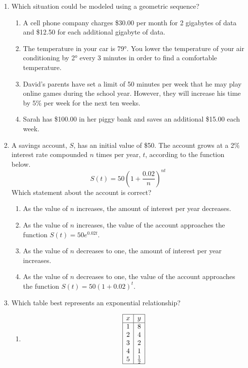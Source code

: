 \documentclass[12pt, twoside]{article}
\begin{document}
\begin{enumerate}[itemsep=0.5cm]
\item Which situation could be modeled using a geometric sequence?
\begin{enumerate}
    \item A cell phone company charges \$30.00 per month for 2 gigabytes of data and \$12.50 for each additional gigabyte of data.
    \item The temperature in your car is 79°. You lower the temperature of your air conditioning by 2° every 3 minutes in order to find a comfortable temperature.
    \item David’s parents have set a limit of 50 minutes per week that he may play online games during the school year. However, they will increase his time by 5\% per week for the next ten weeks.
    \item Sarah has \$100.00 in her piggy bank and saves an additional \$15.00 each week.
\end{enumerate}

\item A savings account, \( S \), has an initial value of \$50. The account grows at a 2\% interest rate compounded \( n \) times per year, \( t \), according to the function below.
\[ S(t) = 50\left(1 + \frac{0.02}{n}\right)^{nt} \]
Which statement about the account is correct?
\begin{enumerate}
    \item As the value of \( n \) increases, the amount of interest per year decreases.
    \item As the value of \( n \) increases, the value of the account approaches the function \( S(t) = 50e^{0.02t} \).
    \item As the value of \( n \) decreases to one, the amount of interest per year increases.
    \item As the value of \( n \) decreases to one, the value of the account approaches the function \( S(t) = 50(1 + 0.02)^t \).
\end{enumerate}

\item Which table best represents an exponential relationship?
\begin{multicols}{4}
\begin{enumerate}

    \item 
    \[
    \begin{array}{|c|c|}
    \hline
    x & y \\
    \hline
    1 & 8 \\
    2 & 4 \\
    3 & 2 \\
    4 & 1 \\
    5 & \frac{1}{2} \\
    \hline
    \end{array}
    \]


\end{enumerate}
\end{multicols}
\end{enumerate}
\end{document}
